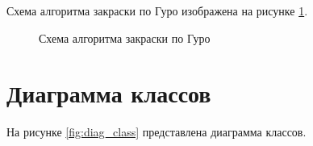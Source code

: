Схема алгоритма закраски по Гуро изображена на рисунке \ref{fig:guro_alg}.

\begin{figure}[ph!]
	\caption{Схема алгоритма закраски по Гуро}
	\label{fig:guro_alg}
\end{figure}

\clearpage

\section{Диаграмма классов}

На рисунке \ref{fig:diag_class} представлена диаграмма классов.

